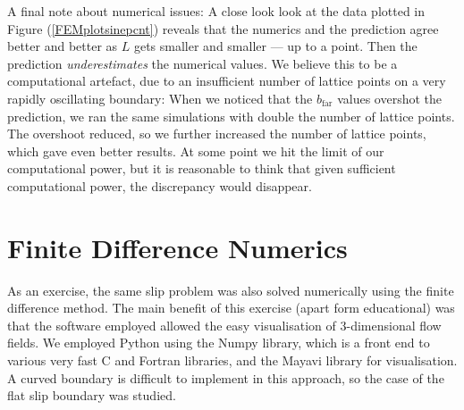 \documentclass[12pt, a4paper, twoside, openright]{book}
\newcommand{\beff}{\ensuremath{b_{\mathrm{eff}}}}
\newcommand{\bfar}{\ensuremath{b_{\mathrm{far}}}}
\begin{document}
A final note about numerical issues:  A close look look at the data plotted in Figure (\ref{FEMplotsinepcnt}) reveals that the numerics and the prediction agree better and better as $L$ gets smaller and smaller --- up to a point.  Then the prediction \emph{underestimates} the numerical values.  We believe this to be a computational artefact, due to an insufficient number of lattice points  on a very rapidly oscillating boundary:  When we noticed that the $\bfar$ values overshot the prediction, we ran the same simulations with double the number of lattice points.  The overshoot reduced, so we further increased the number of lattice points, which gave even better results.  At some point we hit the limit of our computational power, but it is reasonable to think that given sufficient computational power, the discrepancy would disappear.
  









\clearpage
\section{Finite Difference Numerics}

As an exercise, the same slip problem was also solved numerically using the finite difference method.  The main benefit of this exercise (apart form educational) was that the software employed allowed the easy visualisation of 3-dimensional flow fields.  We employed Python using the Numpy library, which is a front end to various very fast C and Fortran libraries, and the Mayavi library for visualisation.  A curved boundary is difficult to implement in this approach, so the case of the flat slip boundary was studied.
\end{document}
